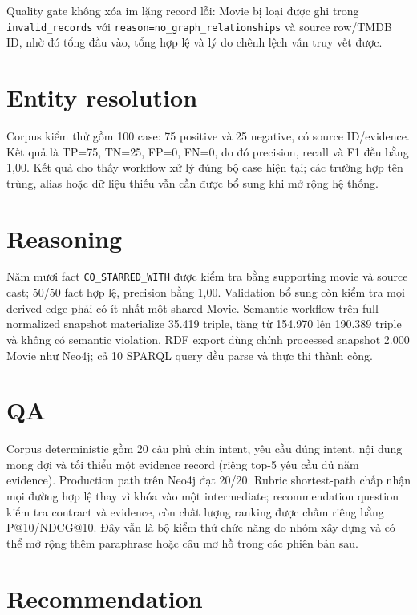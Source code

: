 Quality gate không xóa im lặng record lỗi: Movie bị loại được ghi trong
\texttt{invalid\_records} với \texttt{reason=no\_graph\_relationships} và source row/TMDB ID, nhờ
đó tổng đầu vào, tổng hợp lệ và lý do chênh lệch vẫn truy vết được.

\section{Entity resolution}

Corpus kiểm thử gồm 100 case: 75 positive và 25 negative, có source ID/evidence.
Kết quả là TP=75, TN=25, FP=0, FN=0, do đó precision, recall và F1 đều bằng 1,00.
Kết quả cho thấy workflow xử lý đúng bộ case hiện tại; các trường hợp tên trùng,
alias hoặc dữ liệu thiếu vẫn cần được bổ sung khi mở rộng hệ thống.

\section{Reasoning}

Năm mươi fact \texttt{CO\_STARRED\_WITH} được kiểm tra bằng supporting movie và
source cast; 50/50 fact hợp lệ, precision bằng 1,00. Validation bổ sung còn kiểm
tra mọi derived edge phải có ít nhất một shared Movie. Semantic workflow trên
full normalized snapshot materialize 35.419 triple, tăng từ 154.970 lên 190.389
triple và không có semantic violation. RDF export dùng chính processed snapshot
2.000 Movie như Neo4j; cả 10 SPARQL query đều parse và thực thi thành công.

\section{QA}

Corpus deterministic gồm 20 câu phủ chín intent, yêu cầu đúng intent, nội dung
mong đợi và tối thiểu một evidence record (riêng top-5 yêu cầu đủ năm evidence).
Production path trên Neo4j đạt 20/20. Rubric shortest-path chấp nhận mọi đường hợp
lệ thay vì khóa vào một intermediate; recommendation question kiểm tra contract
và evidence, còn chất lượng ranking được chấm riêng bằng P@10/NDCG@10. Đây vẫn là
bộ kiểm thử chức năng do nhóm xây dựng và có thể mở rộng thêm paraphrase hoặc câu
mơ hồ trong các phiên bản sau.

\section{Recommendation}

